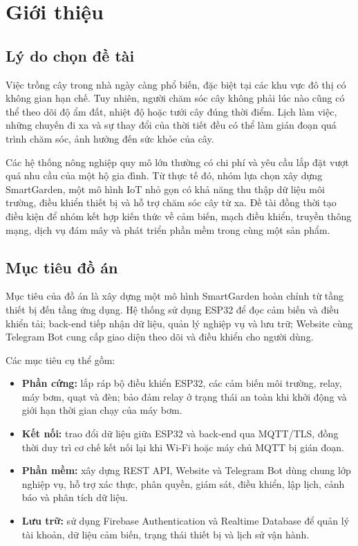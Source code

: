 \section{Giới thiệu}

\subsection{Lý do chọn đề tài}

Việc trồng cây trong nhà ngày càng phổ biến, đặc biệt tại các khu vực đô thị có
không gian hạn chế. Tuy nhiên, người chăm sóc cây không phải lúc nào cũng có thể
theo dõi độ ẩm đất, nhiệt độ hoặc tưới cây đúng thời điểm. Lịch làm việc, những
chuyến đi xa và sự thay đổi của thời tiết đều có thể làm gián đoạn quá trình chăm
sóc, ảnh hưởng đến sức khỏe của cây.

Các hệ thống nông nghiệp quy mô lớn thường có chi phí và yêu cầu lắp đặt vượt quá
nhu cầu của một hộ gia đình. Từ thực tế đó, nhóm lựa chọn xây dựng SmartGarden,
một mô hình IoT nhỏ gọn có khả năng thu thập dữ liệu môi trường, điều khiển thiết
bị và hỗ trợ chăm sóc cây từ xa. Đề tài đồng thời tạo điều kiện để nhóm kết hợp
kiến thức về cảm biến, mạch điều khiển, truyền thông mạng, dịch vụ đám mây và phát
triển phần mềm trong cùng một sản phẩm.

\subsection{Mục tiêu đồ án}

Mục tiêu của đồ án là xây dựng một mô hình SmartGarden hoàn chỉnh từ tầng thiết
bị đến tầng ứng dụng. Hệ thống sử dụng ESP32 để đọc cảm biến và điều khiển tải;
back-end tiếp nhận dữ liệu, quản lý nghiệp vụ và lưu trữ; Website cùng Telegram
Bot cung cấp giao diện theo dõi và điều khiển cho người dùng.

Các mục tiêu cụ thể gồm:

\begin{itemize}
    \item \textbf{Phần cứng:} lắp ráp bộ điều khiển ESP32, các cảm biến môi
    trường, relay, máy bơm, quạt và đèn; bảo đảm relay ở trạng thái an toàn khi
    khởi động và giới hạn thời gian chạy của máy bơm.
    \item \textbf{Kết nối:} trao đổi dữ liệu giữa ESP32 và back-end qua MQTT/TLS,
    đồng thời duy trì cơ chế kết nối lại khi Wi-Fi hoặc máy chủ MQTT bị gián đoạn.
    \item \textbf{Phần mềm:} xây dựng REST API, Website và Telegram Bot dùng
    chung lớp nghiệp vụ, hỗ trợ xác thực, phân quyền, giám sát, điều khiển, lập
    lịch, cảnh báo và phân tích dữ liệu.
    \item \textbf{Lưu trữ:} sử dụng Firebase Authentication và Realtime Database
    để quản lý tài khoản, dữ liệu cảm biến, trạng thái thiết bị và lịch sử vận
    hành.
\end{itemize}

